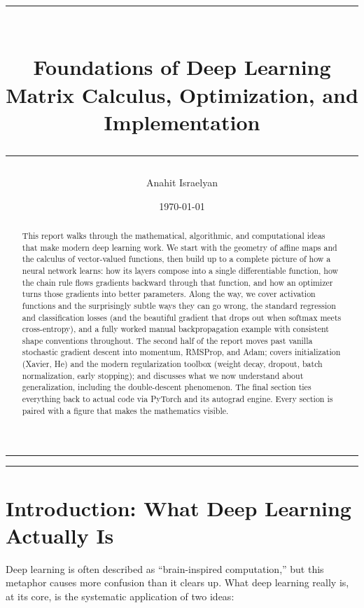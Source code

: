 \documentclass[11pt, a4paper]{article}
\title{
    \vspace{-1.5cm}
    \rule{\textwidth}{1pt}\\[6pt]
    \LARGE\textbf{Foundations of Deep Learning}\\[4pt]
    \large Matrix Calculus, Optimization, and Implementation\\[2pt]
    \rule{\textwidth}{1pt}
}
\author{Anahit Israelyan}
\date{\today}
\let\oldsection\section
\renewcommand{\section}{\clearpage\oldsection}
\begin{document}
\maketitle

\begin{abstract}
\noindent
This report walks through the mathematical, algorithmic, and computational ideas that make modern deep learning work. We start with the geometry of affine maps and the calculus of vector-valued functions, then build up to a complete picture of how a neural network learns: how its layers compose into a single differentiable function, how the chain rule flows gradients backward through that function, and how an optimizer turns those gradients into better parameters. Along the way, we cover activation functions and the surprisingly subtle ways they can go wrong, the standard regression and classification losses (and the beautiful gradient that drops out when softmax meets cross-entropy), and a fully worked manual backpropagation example with consistent shape conventions throughout. The second half of the report moves past vanilla stochastic gradient descent into momentum, RMSProp, and Adam; covers initialization (Xavier, He) and the modern regularization toolbox (weight decay, dropout, batch normalization, early stopping); and discusses what we now understand about generalization, including the double-descent phenomenon. The final section ties everything back to actual code via PyTorch and its autograd engine. Every section is paired with a figure that makes the mathematics visible.
\end{abstract}

\bigskip
\hrule
\tableofcontents
\hrule
\bigskip

\section{Introduction: What Deep Learning Actually Is}

Deep learning is often described as ``brain-inspired computation,'' but this metaphor causes more confusion than it clears up. What deep learning really is, at its core, is the systematic application of two ideas:
\end{document}
